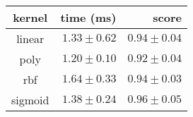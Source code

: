 \begin{tabular}{crr}
\toprule
\textbf{kernel} & \textbf{time (ms)} & \textbf{score}\\
\midrule
linear & $1.33 \pm 0.62$ & $0.94 \pm 0.04$\\
poly & $1.20 \pm 0.10$ & $0.92 \pm 0.04$\\
rbf & $1.64 \pm 0.33$ & $0.94 \pm 0.03$\\
sigmoid & $1.38 \pm 0.24$ & $0.96 \pm 0.05$\\
\bottomrule
\end{tabular}
